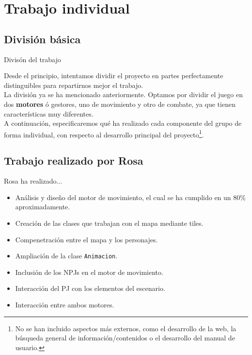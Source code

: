 \documentclass[9pt,xcolor=svgnames]{beamer}
\begin{document}
 \section{Trabajo individual}

 \subsection{División básica}
 \begin{frame}{Divisón del trabajo}
   \transdissolve
   
   Desde el principio, intentamos dividir el proyecto en partes perfectamente
   distinguibles para repartirnos mejor el trabajo.\\

  \vspace*{0.3cm}
   La división ya se ha mencionado anteriormente. Optamos por dividir el
   juego en dos \textbf{motores} ó gestores, uno de movimiento y otro de
   combate, ya que tienen características muy diferentes.\\

  \vspace*{0.3cm}
  A continuación, especificaremos qué ha realizado cada componente del
  grupo de forma individual, con respecto al desarrollo principal del
  proyecto\footnote{No se han incluido aspectos más externos, como el
  desarrollo de la web, la búsqueda general de información/contenidos o
  el desarrollo del manual de usuario.}.

 \end{frame}

\subsection{Trabajo realizado por Rosa}
\begin{frame}{Rosa ha realizado...}
  \transdissolve
  
  \begin{itemize}
  \item Análisis y diseño del motor de movimiento, el cual se ha cumplido
    en un 80\% aproximadamente.
  \item Creación de las clases que trabajan con el mapa mediante tiles.
  \item Compenetración entre el mapa y los personajes.
  \item Ampliación de la clase \texttt{Animacion}.
  \item Inclusión de los NPJs en el motor de movimiento.
  \item Interacción del PJ con los elementos del escenario.
  \item Interacción entre ambos motores.
  \end{itemize}
\end{frame}
\end{document}
